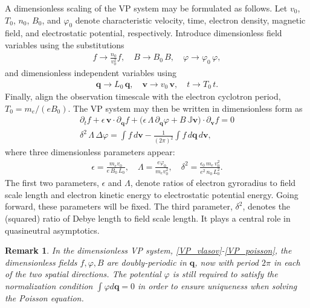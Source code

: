 \documentclass[%
 aip,
 amsmath,amssymb,
reprint, onecolumn %
]{revtex4-1}
\newtheorem{remark}{Remark}
\begin{document}
A dimensionless scaling of the VP system may be formulated as follows. Let $v_0$, $T_0$, $n_0$, $B_0$, and $\varphi_0$ denote characteristic velocity, time, electron density, magnetic field, and electrostatic potential, respectively. Introduce dimensionless field variables using the substitutions
\begin{align*}
f\rightarrow \frac{n_0}{v_0^2}f,\quad B\rightarrow B_0\,B,\quad \varphi\rightarrow \varphi_0\,\varphi,
\end{align*}
and dimensionless independent variables using
\begin{align*}
\bm{q}\rightarrow L_0\,\bm{q},\quad \bm{v}\rightarrow v_0\,\bm{v},\quad t\rightarrow T_0\,t.
\end{align*}
Finally, align the observation timescale with the electron cyclotron period, $T_0 = m_e/(eB_0)$. The VP system may then be written in dimensionless form as
\begin{gather}
\partial_t f + \epsilon\,\bm{v}\cdot\partial_{\bm{q}}f + \bigg(\epsilon\,\Lambda\,\partial_{\bm{q}}\varphi + B\,\mathbb{J}\bm{v} \bigg)\cdot\partial_{\bm{v}}f = 0\label{VP_vlasov}\\
\delta^2\,\Lambda\,\Delta\varphi = \int f\,d\bm{v} - \frac{1}{(2\pi)^2}\int f\,d\bm{q}\,d\bm{v}\label{VP_poisson},
\end{gather}
where three dimensionless parameters appear:
\begin{gather}
\epsilon = \frac{m_ev_0}{e\,B_0\,L_0},\quad \Lambda = \frac{e\varphi_0}{m_ev_0^2},\quad \delta^2 = \frac{\epsilon_0\,m_e\,v_0^2}{e^2\,n_0\,L_0^2}.
\end{gather}
The first two parameters, $\epsilon$ and $\Lambda$, denote ratios of electron gyroradius to field scale length and electron kinetic energy to electrostatic potential energy. Going forward, these parameters will be fixed. The third parameter, $\delta^2$, denotes the (squared) ratio of Debye length to field scale length. It plays a central role in quasineutral asymptotics.

\begin{remark}In the dimensionless VP system, \eqref{VP_vlasov}-\eqref{VP_poisson}, the dimensionless fields $f,\varphi,B$ are doubly-periodic in $\bm{q}$, now with period $2\pi$ in each of the two spatial directions. The potential $\varphi$ is still required to satisfy the normalization condition $\int \varphi d\bm{q} = 0$ in order to ensure uniqueness when solving the Poisson equation.
\end{remark}
\end{document}
